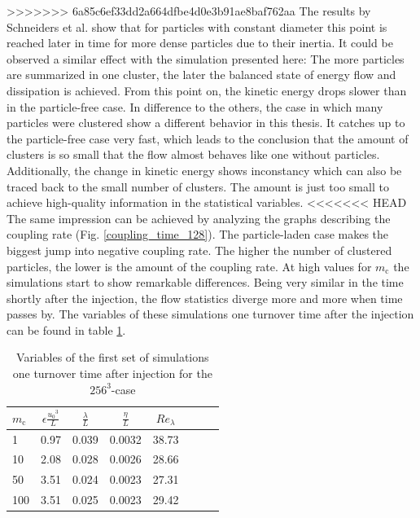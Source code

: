 \documentclass[11pt,a4paper,openany,oneside,parskip=half*]{article}
\begin{document}
>>>>>>> 6a85c6ef33dd2a664dfbe4d0e3b91ae8baf762aa
\newline
The results by Schneiders et al. \cite{Schneiders2017} show that for particles with constant diameter this point is reached later in time for more dense particles due to their inertia. It could be observed a similar effect with the simulation presented here: The more particles are summarized in one cluster, the later the balanced state of energy flow and dissipation is achieved. From this point on, the kinetic energy drops slower than in the particle-free case.
\newline
In difference to the others, the case in which many particles were clustered show a different behavior in this thesis. It catches up to the particle-free case very fast, which leads to the conclusion that the amount of clusters is so small that the flow almost behaves like one without particles. Additionally, the change in kinetic energy shows inconstancy which can also be traced back to the small number of clusters. The amount is just too small to achieve high-quality information in the statistical variables. 
\newline
<<<<<<< HEAD
The same impression can be achieved by analyzing the graphs describing the coupling rate (Fig. \ref{coupling_time_128}). The particle-laden case makes the biggest jump into negative coupling rate. The higher the number of clustered particles, the lower is the amount of the coupling rate. At high values for $m_\mathrm{c}$ the simulations start to show remarkable differences. 
\newline
Being very similar in the time shortly after the injection, the flow statistics diverge more and more when time passes by. The variables of these simulations one turnover time after the injection can be found in table \ref{table_properties}. 
\begin{table}[h]
\begin{center}
\begin{tabular}{l | c c c c c c c }
$m_\mathrm{c}$ & $\epsilon \frac{{u_0}^3}{L}$ & $\frac{\lambda}{L}$ & $\frac{\eta}{L} $ & $Re_\lambda$ \\
\hline
\hline
1 & 0.97& 0.039 & 0.0032 & 38.73 &\\
10 & 2.08 & 0.028 & 0.0026 & 28.66 &\\
50 & 3.51 & 0.024 & 0.0023 & 27.31 &\\
100 & 3.51 & 0.025 & 0.0023 & 29.42 &\\
\hline
\end{tabular}
\caption{Variables of the first set of simulations one turnover time after injection for the $256^3$-case}
\label{table_properties}
\end{center}
\end{table}
\end{document}
